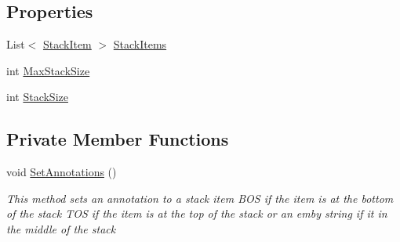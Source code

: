 \subsection*{Properties}
\begin{DoxyCompactItemize}
\item 
List$<$ \hyperlink{class_c_p_u___o_s___simulator_1_1_c_p_u_1_1_stack_item}{Stack\+Item} $>$ \hyperlink{class_c_p_u___o_s___simulator_1_1_c_p_u_1_1_program_stack_a13eb0a485bbcdba8a38bbf80e78692c7}{Stack\+Items}
\item 
int \hyperlink{class_c_p_u___o_s___simulator_1_1_c_p_u_1_1_program_stack_a5ed770e83658cfcde6e451c27342dca3}{Max\+Stack\+Size}
\item 
int \hyperlink{class_c_p_u___o_s___simulator_1_1_c_p_u_1_1_program_stack_ac9cedcbfdf26ffa757042280f21da367}{Stack\+Size}
\end{DoxyCompactItemize}
\subsection*{Private Member Functions}
\begin{DoxyCompactItemize}
\item 
void \hyperlink{class_c_p_u___o_s___simulator_1_1_c_p_u_1_1_program_stack_a64ba20aa2a49863d1197a9aeb31b4a13}{Set\+Annotations} ()
\begin{DoxyCompactList}\small\item\em This method sets an annotation to a stack item B\+O\+S if the item is at the bottom of the stack T\+O\+S if the item is at the top of the stack or an emby string if it in the middle of the stack \end{DoxyCompactList}\end{DoxyCompactItemize}
